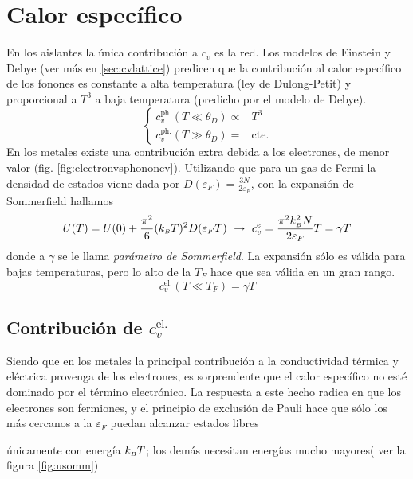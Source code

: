 \section{Calor específico}
En los aislantes la única contribución a $c_v$ es la red. Los modelos
de Einstein y Debye (ver más en \ref{sec:cvlattice}) predicen que la
contribución al calor específico de los fonones es constante a alta temperatura (ley de
Dulong-Petit) y proporcional a $T^3$ a baja temperatura (predicho por
el modelo de Debye).
\begin{equation*}
  \boxed{
  \begin{cases}
    c_v^\text{ph.} (T \ll \theta_D) \propto& T^3 \\
    c_v^\text{ph.} (T \gg \theta_D) =& \text{cte.}
  \end{cases} }
\end{equation*}
En los metales existe una contribución extra debida a los electrones,
de menor valor (fig. \ref{fig:electronvsphononcv}).
Utilizando que para un gas de Fermi la densidad de estados viene dada por
$D(\varepsilon_F) = \frac{3N}{2\varepsilon_F}$, con la expansión de
Sommerfield hallamos
\begin{equation*}
  U(T) = U(0) + \frac{\pi^2}{6} (k_{\scriptscriptstyle{B}}  T)^2 D(\varepsilon_FT) \
  \rightarrow \ c_v^e = \frac{\pi^2 k_{\scriptscriptstyle{B}} ^2 N}{2\varepsilon_F}T = \gamma T 
\end{equation*}
donde a $\gamma$ se le llama \emph{parámetro de Sommerfield}. La
expansión sólo es válida para bajas temperaturas, pero lo alto de la
$T_F$ hace que sea válida en un gran rango.
\begin{equation*}
  \boxed{
    c_v^\text{el.} (T \ll T_F) = \gamma T
  }
\end{equation*}
\subsection{Contribución de $c_v^\text{el.}$}
Siendo que en los metales la principal contribución a la conductividad
térmica y eléctrica provenga de los electrones, es sorprendente que el
calor específico no esté dominado por el término electrónico. La
respuesta a este hecho radica en que los electrones son fermiones, y
el principio de exclusión de Pauli hace que sólo los más cercanos a la
$\varepsilon_{\scriptscriptstyle F}$ puedan alcanzar estados libres

únicamente con energía $k_{\scriptscriptstyle{B}} T$; los demás necesitan energías mucho
mayores( ver la figura \ref{fig:usomm})




